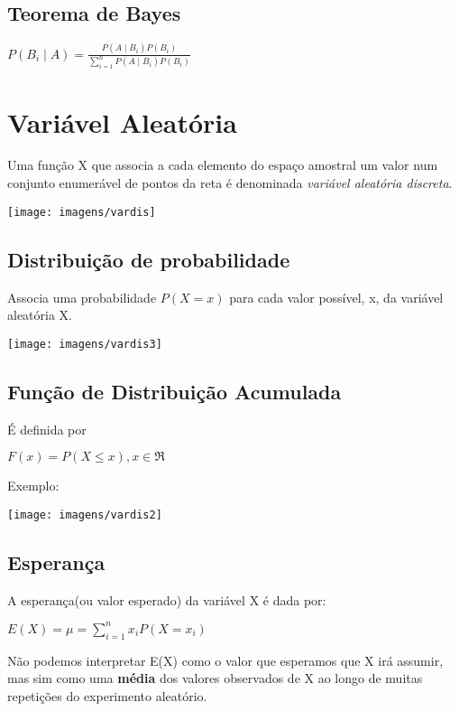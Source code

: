 \documentclass[a4paper, 12pt]{article}
\begin{document}
\subsection{Teorema de Bayes}
	\begin{center}
		\LARGE
		$P(B_{i}\mid A) = 
		\frac{P(A\mid B_{i})P(B_{i}) }{\sum_{i = 1}^{n} P(A\mid B_{i})P(B_{i})}
		$
	\end{center}

\section{Variável Aleatória}
	Uma função X que associa a cada elemento do espaço amostral um valor num conjunto enumerável de pontos da reta é denominada \textit{variável aleatória discreta}.
	\begin{center}
		\texttt{[image: imagens/vardis]}
	\end{center}
	
\subsection{Distribuição de probabilidade}
	Associa uma probabilidade $P(X = x)$ para cada valor possível, x, da variável aleatória X.
	\begin{center}
		\texttt{[image: imagens/vardis3]}
	\end{center}

\subsection{Função de Distribuição Acumulada}
	É definida por
	\begin{center}
		\LARGE
		$F(x) = P(X \leq x), x \in \Re $
	\end{center}
	Exemplo:
	\begin{center}
		\texttt{[image: imagens/vardis2]}
	\end{center}

\subsection{Esperança}
	A esperança(ou valor esperado) da variável X é dada por:
	\begin{center}
		$E(X) = \mu = \sum_{i = 1}^{n} x_{i}P(X = x_{i})$
	\end{center}

	Não podemos interpretar E(X) como o valor que esperamos que X irá assumir, mas sim como uma \textbf{média} dos valores observados de X ao longo de muitas repetições do experimento aleatório.
	
\end{document}
